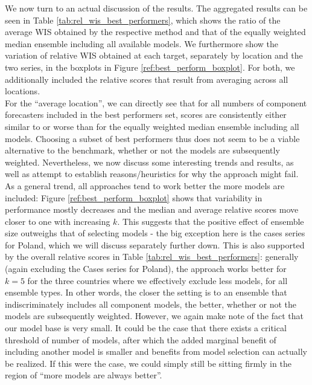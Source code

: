 We now turn to an actual discussion of the results. The aggregated results can be seen in Table \ref{tab:rel_wis_best_performers}, which shows the ratio of the average WIS obtained by the respective method and that of the equally weighted median ensemble including all available models. We furthermore show the variation of relative WIS obtained at each target, separately by location and the two series, in the boxplots in Figure \ref{ref:best_perform_boxplot}. For both, we additionally included the relative scores that result from averaging across all locations.\\
For the ``average location'', we can directly see that for all numbers of component forecasters included in the best performers set, scores are consistently either similar to or worse than for the equally weighted median ensemble including all models. Choosing a subset of best performers thus does not seem to be a viable alternative to the benchmark, whether or not the models are subsequently weighted. Nevertheless, we now discuss some interesting trends and results, as well as attempt to establish reasons/heuristics for why the approach might fail.\\
As a general trend, all approaches tend to work better the more models are included: Figure \ref{ref:best_perform_boxplot} shows that variability in performance mostly decreases and the median and average relative scores move closer to one with increasing $k$. This suggests that the positive effect of ensemble size outweighs that of selecting models - the big exception here is the cases series for Poland, which we will discuss separately further down. This is also supported by the overall relative scores in Table \ref{tab:rel_wis_best_performers}: generally (again excluding the Cases series for Poland), the approach works better for $k = 5$ for the three countries where we effectively exclude less models, for all ensemble types. In other words, the closer the setting is to an ensemble that indiscriminately includes all component models, the better, whether or not the models are subsequently weighted. However, we again make note of the fact that our model base is very small. It could be the case that there exists a critical threshold of number of models, after which the added marginal benefit of including another model is smaller and benefits from model selection can actually be realized. If this were the case, we could simply still be sitting firmly in the region of ``more models are always better''.\\
